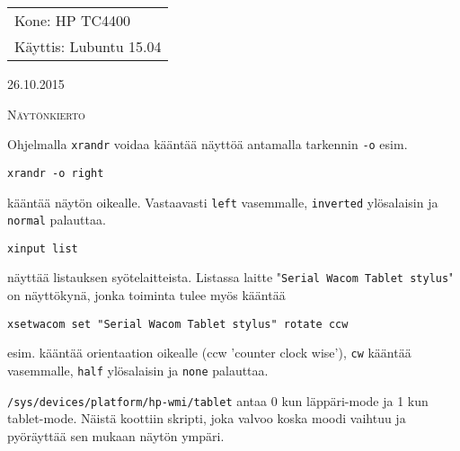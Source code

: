 \documentclass[main.tex]{subfiles}
\begin{document}
\thispagestyle{empty}
\begin{tabular}[t]{l}
Kone: HP TC4400\\
Käyttis: Lubuntu 15.04
\end{tabular}
\hfill 26.10.2015

{\scshape\Large{Näytönkierto}}

Ohjelmalla \texttt{xrandr} voidaa kääntää näyttöä antamalla tarkennin \texttt{-o} esim.

\begin{lstlisting}
xrandr -o right
\end{lstlisting}

kääntää näytön oikealle. Vastaavasti \texttt{left} vasemmalle, \texttt{inverted} ylösalaisin ja \texttt{normal} palauttaa.

\begin{lstlisting}
xinput list
\end{lstlisting}

näyttää listauksen syötelaitteista. Listassa laitte "\texttt{Serial Wacom Tablet stylus}" on näyttökynä, jonka toiminta tulee myös kääntää

\begin{lstlisting}
xsetwacom set "Serial Wacom Tablet stylus" rotate ccw
\end{lstlisting}

esim. kääntää orientaation oikealle (ccw 'counter clock wise'), \texttt{cw} kääntää vasemmalle, \texttt{half} ylösalaisin ja \texttt{none} palauttaa.

\texttt{/sys/devices/platform/hp-wmi/tablet} antaa 0 kun läppäri-mode ja 1 kun tablet-mode. Näistä koottiin skripti, joka valvoo koska moodi vaihtuu ja pyöräyttää sen mukaan näytön ympäri.

\end{document}
